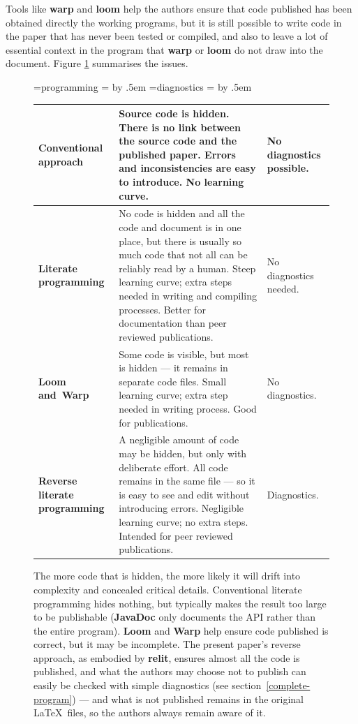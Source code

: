 \documentclass[12pt]{article}
\def\name#1{\textbf{#1}}
\def\mycaption#1{\sf\bfseries\caption{\sf #1}}
\begin{document}
Tools like \name{warp} and \name{loom} help the authors ensure that code published has been obtained directly the working programs, but it is still possible to write code in the paper that has never been tested or compiled, and also to leave a lot of essential context in the program that \name{warp} or \name{loom} do not draw into the document. Figure \ref{fig:lp2} summarises the issues. 

\begin{figure}
\begin{center}\sf
\newdimen\cola {}=\hbox{programming} \cola= \advance\cola by .5em
\newdimen\colc {}=\hbox{diagnostics} \colc= \advance\colc by .5em
\def\gap{\vskip .5ex\hrule\vskip .5ex}
\noindent\begin{tabular}{|p{\cola}|p{3.4in}|p{\colc}|}  \hline
\bfseries Conventional approach& 
Source code is hidden. There is no link between the source code and the published paper. Errors and inconsistencies are easy to introduce. No learning curve.&
No \hbox{diagnostics} possible. \\ \hline

\bfseries Literate \hbox{programming}& 
No code is hidden and all the code and document is in one place, but there is usually so much code that not all can be reliably read by a human.  Steep learning curve; extra steps needed in writing and compiling processes. Better for documentation than peer reviewed publications.&
No \hbox{diagnostics} needed. \gap \hbox{Fewer files} to maintain.\\ \hline

\bfseries \hbox{Loom} \hbox{and Warp}& 
Some code is visible, but most is hidden --- it remains in separate code files. Small learning curve; extra step needed in writing process. Good for publications.&
No \hbox{diagnostics}. \\ \hline

\bfseries Reverse literate \hbox{programming}& 
A negligible amount of code may be hidden, but only with deliberate effort. All code remains in the same file --- so it is easy to see and edit without introducing errors. Negligible learning curve; no extra steps. Intended for peer reviewed publications. &Diagnostics. \gap \hbox{Fewer files} to maintain. \\ \hline
\end{tabular}
\end{center}
\mycaption{The more code that is hidden, the more likely it will drift into complexity and concealed critical details. Conventional literate programming hides nothing, but typically makes the result too large to be publishable (\name{JavaDoc} only documents the API rather than the entire program). \name{Loom} and \name{Warp} help ensure code published is correct, but it may be incomplete. The present paper's reverse approach, as embodied by \name{relit}, ensures almost all the code is published, and what the authors may choose not to publish can easily be checked with simple diagnostics (see section~\ref{complete-program}) --- and what is not published remains in the original \LaTeX\ files, so the authors always remain aware of it.}
\label{fig:lp2}
\end{figure}
\end{document}
